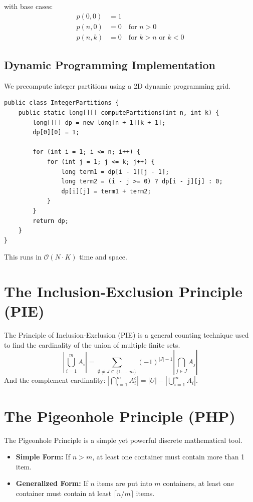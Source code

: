 \documentclass[10pt,journal,compsoc,onecolumn]{IEEEtran}
\begin{document}
with base cases:
\begin{align}
p(0, 0) &= 1 \\
p(n, 0) &= 0 \quad \text{for } n > 0 \\
p(n, k) &= 0 \quad \text{for } k > n \text{ or } k < 0
\end{align}

\subsection{Dynamic Programming Implementation}
We precompute integer partitions using a 2D dynamic programming grid.

\begin{verbatim}
public class IntegerPartitions {
    public static long[][] computePartitions(int n, int k) {
        long[][] dp = new long[n + 1][k + 1];
        dp[0][0] = 1;

        for (int i = 1; i <= n; i++) {
            for (int j = 1; j <= k; j++) {
                long term1 = dp[i - 1][j - 1];
                long term2 = (i - j >= 0) ? dp[i - j][j] : 0;
                dp[i][j] = term1 + term2;
            }
        }
        return dp;
    }
}
\end{verbatim}
This runs in $\mathcal{O}(N \cdot K)$ time and space.

\section{The Inclusion-Exclusion Principle (PIE)}
\label{sec:pie}

The Principle of Inclusion-Exclusion (PIE) is a general counting technique used to find the cardinality of the union of multiple finite sets.
\begin{equation}
\left| \bigcup_{i=1}^{m} A_i \right| = \sum_{\emptyset \neq J \subseteq \{1, \dots, m\}} (-1)^{|J|-1} \left| \bigcap_{j \in J} A_j \right|
\end{equation}
And the complement cardinality: $\left| \bigcap_{i=1}^{m} A_i^c \right| = |U| - \left| \bigcup_{i=1}^{m} A_i \right|$.

\section{The Pigeonhole Principle (PHP)}
\label{sec:php}

The Pigeonhole Principle is a simple yet powerful discrete mathematical tool.
\begin{itemize}
    \item \textbf{Simple Form:} If $n > m$, at least one container must contain more than 1 item.
    \item \textbf{Generalized Form:} If $n$ items are put into $m$ containers, at least one container must contain at least $\lceil n/m \rceil$ items.
\end{itemize}
\end{document}
